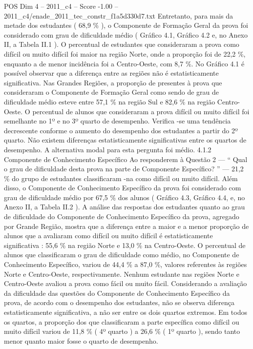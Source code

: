 \begin{textsample}{POS Dim 4 – 2011\_c4 – Score -1.00 – 2011\_c4/enade\_2011\_tec\_constr\_f1a5d330d7.txt}
Entretanto, para mais da metade dos estudantes ( 68,9 \% ), o Componente de Formação Geral da prova foi considerado com grau de dificuldade médio ( Gráfico 4.1, Gráfico 4.2 e, no Anexo II, a Tabela II.1 ).
O percentual de estudantes que consideraram a prova como difícil ou muito difícil foi maior na região Norte, onde a proporção foi de 22,2 \%, enquanto a de menor incidência foi a Centro-Oeste, com 8,7 \%.
No Gráfico 4.1 é possível observar que a diferença entre as regiões não é estatisticamente significativa.
Nas Grandes Regiões, a proporção de presentes à prova que consideraram o Componente de Formação Geral como sendo de grau de dificuldade médio esteve entre 57,1 \% na região Sul e 82,6 \% na região Centro-Oeste.
O percentual de alunos que consideraram a prova difícil ou muito difícil foi semelhante no 1º e no 3º quarto de desempenho.
Verifica -se uma tendência decrescente conforme o aumento do desempenho dos estudantes a partir do 2º quarto.
Não existem diferenças estatisticamente significativas entre os quartos de desempenho.
A alternativa modal para esta pergunta foi médio. 4.1.2 Componente de Conhecimento Específico Ao responderem à Questão 2 — “ Qual o grau de dificuldade desta prova na parte de Componente Específico? ” — 21,2 \% do grupo de estudantes classificaram -na como difícil ou muito difícil.
Além disso, o Componente de Conhecimento Específico da prova foi considerado com grau de dificuldade médio por 67,5 \% dos alunos ( Gráfico 4.3, Gráfico 4.4, e, no Anexo II, a Tabela II.2 ).
A análise das respostas dos estudantes quanto ao grau de dificuldade do Componente de Conhecimento Específico da prova, agregado por Grande Região, mostra que a diferença entre a maior e a menor proporção de alunos que a avaliaram como difícil ou muito difícil é estatisticamente significativa : 55,6 \% na região Norte e 13,0 \% na Centro-Oeste.
O percentual de alunos que classificaram o grau de dificuldade como médio, no Componente de Conhecimento Específico, variou de 44,4 \% a 87,0 \%, valores referentes às regiões Norte e Centro-Oeste, respectivamente.
Nenhum estudante nas regiões Norte e Centro-Oeste avaliou a prova como fácil ou muito fácil.
Considerando a avaliação da dificuldade das questões do Componente de Conhecimento Específico da prova, de acordo com o desempenho dos estudantes, não se observa diferença estatisticamente significativa, a não ser entre os dois quartos extremos.
Em todos os quartos, a proporção dos que classificaram a parte específica como difícil ou muito difícil variou de 11,8 \% ( 4º quarto ) a 26,6 \% ( 1º quarto ), sendo tanto menor quanto maior fosse o quarto de desempenho.

\end{textsample}
